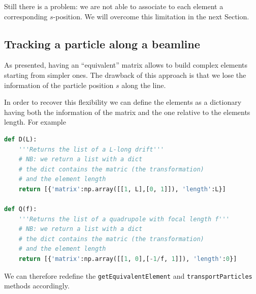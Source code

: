 \documentclass{article}
\begin{document}
Still there is a problem: we are not able to associate to each element a corresponding $s$-position. We will overcome this limitation in the next Section.

\subsection{Tracking a particle along a beamline}
\label{sec:dict}

As presented, having an ``equivalent'' matrix allows to build complex elements starting from simpler ones. The drawback of this approach is that we lose the information of the particle position $s$ along the line.

In order to recover this flexibility we can define the elements as a dictionary having both the information of the matrix and the one relative to the elements length. For example

\begin{lstlisting}[language=Python]
def D(L):
    '''Returns the list of a L-long drift'''
    # NB: we return a list with a dict
    # the dict contains the matric (the transformation)
    # and the element length 
    return [{'matrix':np.array([[1, L],[0, 1]]), 'length':L}] 

def Q(f):
    '''Returns the list of a quadrupole with focal length f'''
    # NB: we return a list with a dict
    # the dict contains the matric (the transformation)
    # and the element length 
    return [{'matrix':np.array([[1, 0],[-1/f, 1]]), 'length':0}]
\end{lstlisting}
We can therefore redefine the \texttt{getEquivalentElement} and \texttt{transportParticles} methods accordingly.
\end{document}
